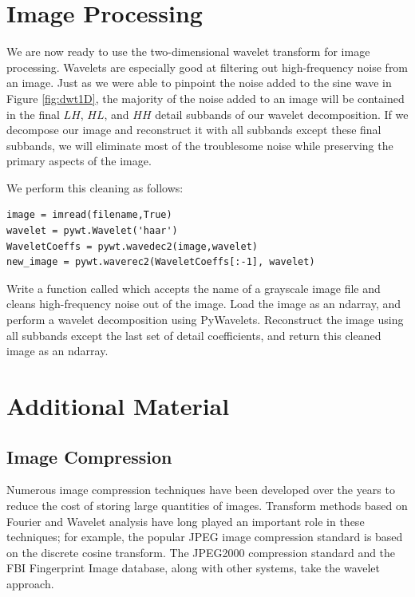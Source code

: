 \section*{Image Processing}
We are now ready to use the two-dimensional wavelet transform for image processing.
Wavelets are especially good at filtering out high-frequency noise from an image.
Just as we were able to pinpoint the noise added to the sine wave in Figure \ref{fig:dwt1D}, the majority of the noise added to an image will be contained in the final $LH$, $HL$, and $HH$ detail subbands of our wavelet decomposition.
If we decompose our image and reconstruct it with all subbands except these final subbands, we will eliminate most of the troublesome noise while preserving the primary aspects of the image.

We perform this cleaning as follows:
\begin{lstlisting}
image = imread(filename,True)
wavelet = pywt.Wavelet('haar')
WaveletCoeffs = pywt.wavedec2(image,wavelet)
new_image = pywt.waverec2(WaveletCoeffs[:-1], wavelet)
\end{lstlisting}

\begin{problem}
Write a function called  which accepts the name of a grayscale image file and cleans high-frequency noise out of the image.
Load the image as an ndarray, and perform a wavelet decomposition using PyWavelets.
Reconstruct the image using all subbands except the last set of detail coefficients, and return this cleaned image as an ndarray.
\end{problem}

\newpage

\section*{Additional Material}

\subsection*{Image Compression} %

Numerous image compression techniques have been developed over the years to reduce the cost of storing large quantities of images.
Transform methods based on Fourier and Wavelet analysis have long played an important role in these techniques; for example, the popular JPEG image compression standard is based on the discrete cosine transform.
The JPEG2000 compression standard and the FBI Fingerprint Image database, along with other systems, take the wavelet approach.

